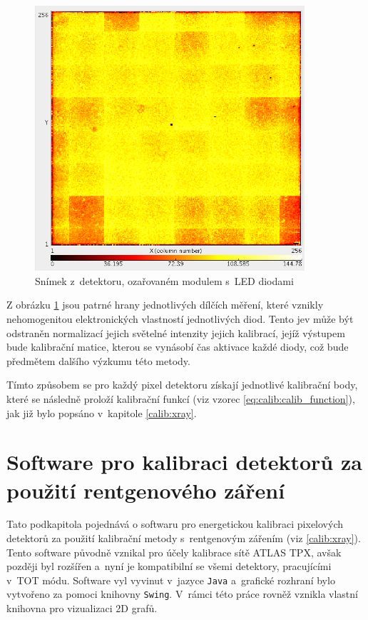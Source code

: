 \begin{figure}[th]
	\begin{center}
		\includegraphics[width=10cm]{figures/led_calib_frame.png}
		\caption{Snímek z~detektoru, ozařovaném modulem s~LED diodami}
		\label{fig:calib:led_frame}
	\end{center}
\end{figure}

Z obrázku \ref{fig:calib:led_frame} jsou patrné hrany jednotlivých dílčích měření, které vznikly nehomogenitou elektronických vlastností jednotlivých diod. Tento jev může být odstraněn normalizací jejich světelné intenzity jejich kalibrací, jejíž výstupem bude kalibrační matice, kterou se vynásobí čas aktivace každé diody, což bude předmětem dalšího výzkumu této metody.

Tímto způsobem se pro každý pixel detektoru získají jednotlivé kalibrační body, které se následně proloží kalibrační funkcí (viz vzorec \ref{eq:calib:calib_function}), jak již bylo popsáno v~kapitole \ref{calib:xray}.


\section{Software pro kalibraci detektorů za použití rentgenového záření}\label{calib:sw}

Tato podkapitola pojednává o softwaru pro energetickou kalibraci pixelových detektorů za použití kalibrační metody s~rentgenovým zářením (viz \ref{calib:xray}). Tento software původně vznikal pro účely kalibrace sítě ATLAS TPX, avšak později byl rozšířen a~nyní je kompatibilní se všemi detektory, pracujícími v~TOT módu. Software vyl vyvinut v~jazyce \texttt{Java} a~grafické rozhraní bylo vytvořeno za pomoci knihovny \texttt{Swing}. V~rámci této práce rovněž vznikla vlastní knihovna pro vizualizaci 2D grafů.


